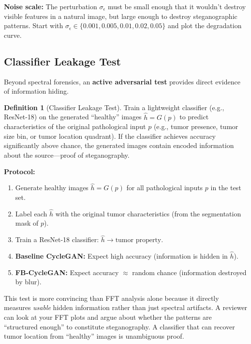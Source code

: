 \documentclass[11pt,a4paper]{article}
\theoremstyle{definition}
\newtheorem{definition}{Definition}[section]
\begin{document}
\begin{edgecase}
\textbf{Noise scale:} The perturbation $\sigma_\epsilon$ must be small enough that it wouldn't destroy visible features in a natural image, but large enough to destroy steganographic patterns. Start with $\sigma_\epsilon \in \{0.001, 0.005, 0.01, 0.02, 0.05\}$ and plot the degradation curve.
\end{edgecase}

\subsection{Classifier Leakage Test}

Beyond spectral forensics, an \textbf{active adversarial test} provides direct evidence of information hiding.

\begin{definition}[Classifier Leakage Test]
Train a lightweight classifier (e.g., ResNet-18) on the generated ``healthy'' images $\hat{h} = G(p)$ to predict characteristics of the original pathological input $p$ (e.g., tumor presence, tumor size bin, or tumor location quadrant). If the classifier achieves accuracy significantly above chance, the generated images contain encoded information about the source---proof of steganography.
\end{definition}

\textbf{Protocol:}
\begin{enumerate}
    \item Generate healthy images $\hat{h} = G(p)$ for all pathological inputs $p$ in the test set.
    \item Label each $\hat{h}$ with the original tumor characteristics (from the segmentation mask of $p$).
    \item Train a ResNet-18 classifier: $\hat{h} \to \text{tumor property}$.
    \item \textbf{Baseline CycleGAN:} Expect high accuracy (information is hidden in $\hat{h}$).
    \item \textbf{FB-CycleGAN:} Expect accuracy $\approx$ random chance (information destroyed by blur).
\end{enumerate}

\begin{keyinsight}
This test is more convincing than FFT analysis alone because it directly measures \textit{usable} hidden information rather than just spectral artifacts. A reviewer can look at your FFT plots and argue about whether the patterns are ``structured enough'' to constitute steganography. A classifier that can recover tumor location from ``healthy'' images is unambiguous proof.
\end{keyinsight}
\end{document}
